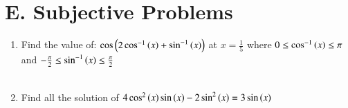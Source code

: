 \documentclass[journal,12pt,twocolumn,article]{IEEEtran}
\theoremstyle{remark}
\begin{document}
\section*{E. Subjective Problems}
\begin{enumerate}
\item Find the value of: $\cos \left(2\cos ^{-1}\left(x\right)+\sin ^{-1}\left(x\right)\right)$ at $x=\frac{1}{5}$ where $0\le \cos ^{-1}\left(x\right) \le \pi$ and $-\frac{\pi}{2}\le \sin ^{-1}\left(x\right) \le\frac{\pi}{2}$
\hfill {}\\\\
\item Find all the solution of $4\cos ^2\left(x\right)\sin \left(x\right)-2\sin ^2 \left(x\right) = 3\sin \left(x\right)$
\hfill {}

\end{enumerate}
\end{document}
